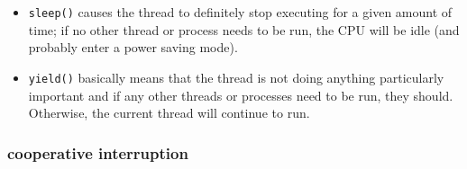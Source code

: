 \documentclass[a4paper,11pt,twoside]{book}
\begin{document}
\begin{itemize}
\begin{lstlisting}[frame=single, language=c++]
	void foo(){
		std::thread::id this_id = std::this_thread::get_id();
		
		g_display_mutex.lock();
		std::cout << "thread " << this_id << " sleeping...\n";
		g_display_mutex.unlock();
		
		std::this_thread::sleep_for(std::chrono::seconds(1));
	}
	
	int main(){
		std::thread t1(foo);
		std::thread t2(foo);
		
		t1.join();
		t2.join();
	}
\end{lstlisting}	
	
	
	\item \texttt{sleep()} causes the thread to definitely stop executing for a given amount of time; if no other thread or process needs to be run, the CPU will be idle (and probably enter a power saving mode).
	
	\item \texttt{yield()} basically means that the thread is not doing anything particularly important and if any other threads or processes need to be run, they should. Otherwise, the current thread will continue to run.
	
\end{itemize}

\subsubsection{cooperative interruption}
\end{document}
